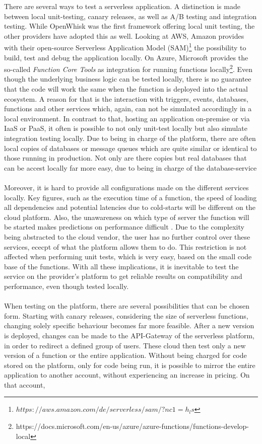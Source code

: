 \documentclass[a4paper,11pt, pagesize]{scrartcl}
\begin{document}
\begin{spacing}{1.2}
There are several ways to test a serverless application. A distinction is made between local unit-testing, canary releases, as well as A/B testing and integration testing. While OpenWhisk was the first framework offering local unit testing, the other providers have adopted this as well. Looking at AWS, Amazon provides with their open-source Serverless Application Model (SAM)\footnote{$https://aws.amazon.com/de/serverless/sam/?nc1=h_ls$} the possibility to build, test and debug the application locally. On Azure, Microsoft provides the so-called \textit{Function Core Tools} as integration for running functions locally\footnote{https://docs.microsoft.com/en-us/azure/azure-functions/functions-develop-local}. Even though the underlying business logic can be tested locally, there is no guarantee that the code will work the same when the function is deployed into the actual ecosystem. A reason for that is the interaction with triggers, events, databases, functions and other services which, again, can not be simulated accordingly in a local environment. In contrast to that, hosting an application on-premise or via IaaS or PaaS, it often is possible to not only unit-test locally but also simulate integration testing locally. Due to being in charge of the platform, there are often local copies of databases or message queues which are quite similar or identical to those running in production. Not only are there copies but real databases that can be accest locally far more easy, due to being in charge of the \glqq database-service\grqq{}\\\\ Moreover, it is hard to provide all configurations made on the different services locally. Key figures, such as the execution time of a function, the speed of loading all dependencies and potential latencies due to cold-starts will be different on the cloud platform. Also, the unawareness on which type of server the function will be started makes predictions on performance difficult \cite{racicot2019quality}. Due to the complexity being abstracted to the cloud vendor, the user has no further control over these services, ececpt of what the platform allows them to do. This restriction is not affected when performing unit tests, which is very easy, based on the small code base of the functions. With all these implications, it is inevitable to test the service on the provider's platform to get reliable results on compatibility and performance, even though tested locally.\\\\ When testing on the platform, there are several possibilities that can be chosen form. Starting with canary releases, considering the size of serverless functions, changing solely specific behaviour becomes far more feasible. After a new version is deployed, changes can be made to the API-Gateway of the serverless platform, in order to redirect a defined group of users. These cloud then test only a new version of a function or the entire application. Without being charged for code stored on the platform, only for code being run, it is possible to mirror the entire application to another account, without experiencing an increase in pricing. On that account, 
\end{spacing}
\end{document}
